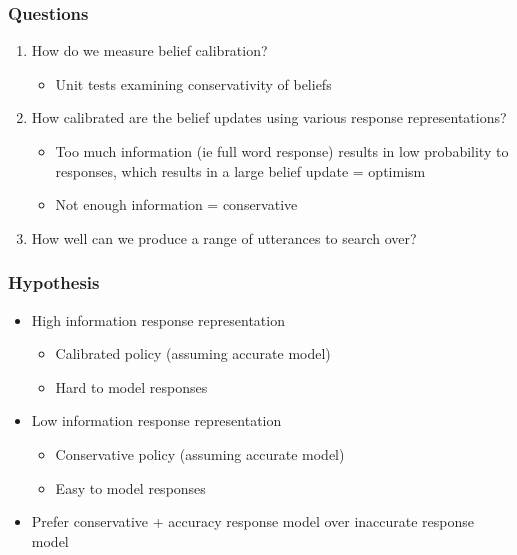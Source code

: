 \documentclass{beamer}
\begin{document}
\begin{frame}
\frametitle{Questions}
\begin{enumerate}
\item How do we measure belief calibration?
    \begin{itemize}
    \item Unit tests examining conservativity of beliefs
    \end{itemize}
\item How calibrated are the belief updates using various response representations?
    \begin{itemize}
    \item Too much information (ie full word response) results in low probability
        to responses, which results in a large belief update = optimism
    \item Not enough information = conservative
    \end{itemize}
\item How well can we produce a range of utterances to search over?
\end{enumerate}
\end{frame}

\begin{frame}
\frametitle{Hypothesis}
\begin{itemize}
\item High information response representation
    \begin{itemize}
    \item Calibrated policy (assuming accurate model)
    \item Hard to model responses
    \end{itemize}
\item Low information response representation
    \begin{itemize}
    \item Conservative policy (assuming accurate model)
    \item Easy to model responses
    \end{itemize}
\item Prefer conservative + accuracy response model over
    inaccurate response model
\end{itemize}
\end{frame}
\end{document}
